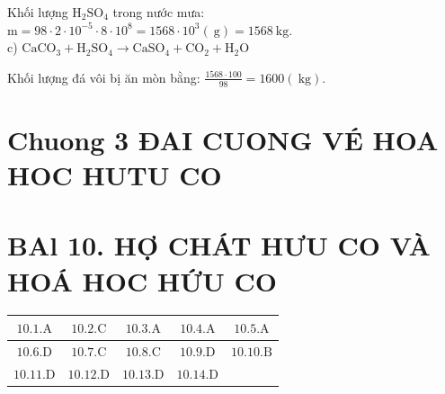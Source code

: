 \documentclass[10pt]{article}
\begin{document}
Khối lượng $\mathrm{H}_{2} \mathrm{SO}_{4}$ trong nước mưa:\\
$\mathrm{m}=98 \cdot 2 \cdot 10^{-5} \cdot 8 \cdot 10^{8}=1568 \cdot 10^{3}(\mathrm{~g})=1568 \mathrm{~kg}$.\\
c) $\mathrm{CaCO}_{3}+\mathrm{H}_{2} \mathrm{SO}_{4} \longrightarrow \mathrm{CaSO}_{4}+\mathrm{CO}_{2}+\mathrm{H}_{2} \mathrm{O}$

Khối lượng đá vôi bị ăn mòn bằng: $\frac{1568 \cdot 100}{98}=1600(\mathrm{~kg})$.

\section*{Chuong 3 ĐAI CUONG VÉ HOA HOC HUTU CO}
\section*{BAl 10. HỢ CHÁT HƯU CO VÀ HOÁ HOC HỨU CO}
\begin{center}
\begin{tabular}{|c|c|c|c|c|}
\hline
$10.1 . \mathrm{A}$ & $10.2 . \mathrm{C}$ & $10.3 . \mathrm{A}$ & $10.4 . \mathrm{A}$ & $10.5 . \mathrm{A}$ \\
\hline
$10.6 . \mathrm{D}$ & $10.7 . \mathrm{C}$ & $10.8 . \mathrm{C}$ & $10.9 . \mathrm{D}$ & $10.10 . \mathrm{B}$ \\
\hline
$10.11 . \mathrm{D}$ & $10.12 . \mathrm{D}$ & $10.13 . \mathrm{D}$ & $10.14 . \mathrm{D}$ &  \\
\hline
\end{tabular}
\end{center}
\end{document}
